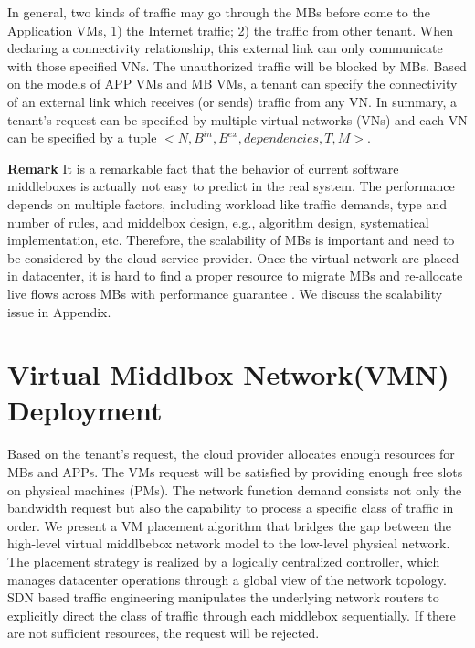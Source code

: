 \documentclass[review]{elsarticle}
\begin{document}
In general, two kinds of traffic may go through the MBs before come to the Application VMs, 1) the Internet traffic; 2) the traffic from other tenant. When declaring a connectivity relationship, this external link can only communicate with those specified VNs. The unauthorized traffic will be blocked by MBs. Based on the models of APP VMs and MB VMs, a tenant can specify the connectivity of an external link which receives (or sends) traffic from any VN. In summary, a tenant's request can be specified by multiple virtual networks (VNs) and each VN can be specified by a tuple $<N, B^{in}, B^{ex}, dependencies, T, M>$. 

\noindent \textbf{Remark } 
It is a remarkable fact that the behavior of current software middleboxes is actually not easy to predict in the real system. The performance depends on multiple factors, including workload like traffic demands, type and number of rules, and middelbox design, e.g., algorithm design, systematical implementation, etc. Therefore, the scalability of MBs is important and need to be considered by the cloud service provider. Once the virtual network are placed in datacenter, it is hard to find a proper resource to migrate MBs and re-allocate live flows across MBs with performance guarantee \cite{G13dio}. We discuss the scalability issue in Appendix.


\section{Virtual Middlbox Network(VMN) Deployment}\label{sec:algorithm}
Based on the tenant's request, the cloud provider allocates enough resources for MBs and APPs. The VMs request will be satisfied by providing enough free slots on physical machines (PMs). The network function demand consists not only the bandwidth request but also the capability to process a specific class of traffic in order. We present a VM placement algorithm that bridges the gap between the high-level virtual middlbebox network model to the low-level physical network. The placement strategy is realized by a logically centralized controller, which manages datacenter operations through a global view of the network topology. SDN based traffic engineering manipulates the underlying network routers to explicitly direct the class of traffic through each middlebox sequentially. If there are not sufficient resources, the request will be rejected. 
\end{document}

